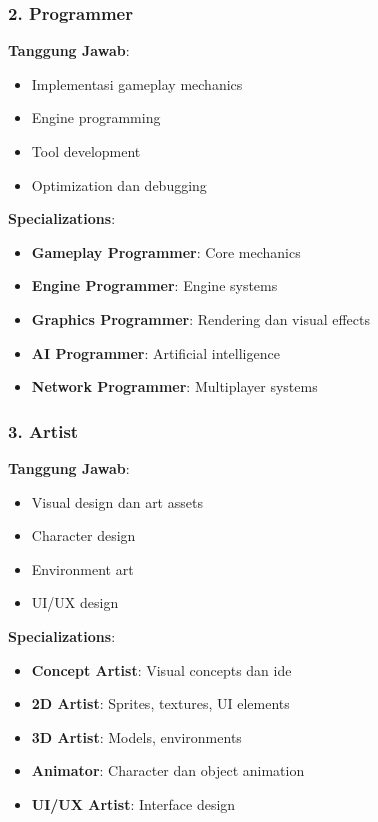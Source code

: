\subsubsection{2. Programmer}

\textbf{Tanggung Jawab}:
\begin{itemize}
\item Implementasi gameplay mechanics
\item Engine programming
\item Tool development
\item Optimization dan debugging
\end{itemize}

\textbf{Specializations}:
\begin{itemize}
\item \textbf{Gameplay Programmer}: Core mechanics
\item \textbf{Engine Programmer}: Engine systems
\item \textbf{Graphics Programmer}: Rendering dan visual effects
\item \textbf{AI Programmer}: Artificial intelligence
\item \textbf{Network Programmer}: Multiplayer systems
\end{itemize}

\subsubsection{3. Artist}

\textbf{Tanggung Jawab}:
\begin{itemize}
\item Visual design dan art assets
\item Character design
\item Environment art
\item UI/UX design
\end{itemize}

\textbf{Specializations}:
\begin{itemize}
\item \textbf{Concept Artist}: Visual concepts dan ide
\item \textbf{2D Artist}: Sprites, textures, UI elements
\item \textbf{3D Artist}: Models, environments
\item \textbf{Animator}: Character dan object animation
\item \textbf{UI/UX Artist}: Interface design
\end{itemize}

